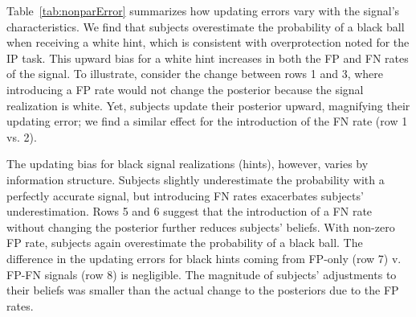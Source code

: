 \documentclass[12pt,a4paper]{article}
\begin{document}
\begin{table}[H]\centering 
\caption{Average Updating Error by Signal Type} 
\label{tab:nonparError}
\end{table}



Table~\ref{tab:nonparError} summarizes how updating errors vary with the signal's characteristics. We find that subjects overestimate the probability of a black ball when receiving a white hint, which is consistent with overprotection noted for the IP task. This upward bias for a white hint increases in both the FP and FN rates of the signal. To illustrate, consider the change between rows 1 and 3, where introducing a FP rate would not change the posterior because the signal realization is white. Yet, subjects update their posterior upward, magnifying their updating error; we find a similar effect for the introduction of the FN rate (row 1 vs. 2).

The updating bias for black signal realizations (hints), however, varies by information structure. Subjects slightly underestimate the probability with a perfectly accurate signal, but introducing FN rates exacerbates subjects' underestimation. Rows 5 and 6 suggest that the introduction of a FN rate without changing the posterior further reduces subjects' beliefs. With non-zero FP rate, subjects again overestimate the probability of a black ball. The difference in the updating errors for black hints coming from FP-only (row 7) v. FP-FN signals (row 8) is negligible. 
The magnitude of subjects' adjustments to their beliefs was smaller than the actual change to the posteriors due to the FP rates.
\end{document}
